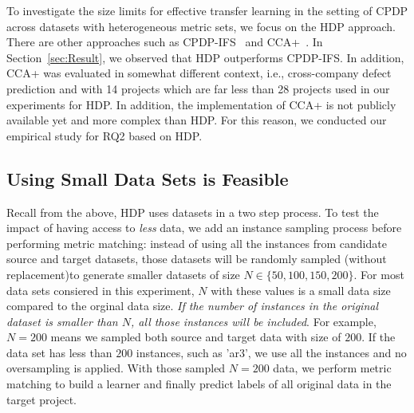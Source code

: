 To investigate the size limits for effective transfer learning in the setting of CPDP across datasets with heterogeneous metric sets, we focus on the HDP approach. There are other approaches such as CPDP-IFS~\cite{He14} and CCA+~\cite{Jing15}. In Section~\ref{sec:Result}, we observed that HDP outperforms CPDP-IFS. In addition, CCA+ was evaluated in somewhat different context, i.e., cross-company defect prediction and with 14 projects which are far less than 28 projects used in our experiments for HDP. In addition, the implementation of CCA+ is not publicly available yet and more complex than HDP. For this reason, we conducted our empirical study for RQ2 based on HDP.



 
\subsection{Using Small Data Sets is Feasible}

Recall from the above,
HDP uses  datasets  in a two step process.
To test the impact of having access to {\em less} data,
we  add an instance sampling process before performing metric matching:
instead of using all the instances from
candidate source and target datasets, those datasets will
be randomly sampled (without replacement)to generate smaller datasets of
size $N \in \{50, 100, 150, 200\}$. For most data sets consiered in this experiment, $N$ with these values is a 
small data size compared to the orginal data size. {\it If
the number of instances in the original dataset is
smaller than $N$, all those instances will be
included}. For example, $N=200$ means we sampled both source and target data with size of $200$. If the data set has less than $200$ instances, such as 'ar3', we use all
the instances and no oversampling is applied. With those sampled $N=200$ data, we perform metric matching to build a learner
and finally predict labels of all original data in the target project.

